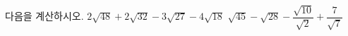 다음을 계산하시오.
 $2\sqrt{48}+2\sqrt{32}-3\sqrt{27}-4\sqrt{18}$
 $\sqrt{45}-\sqrt{28}-\dfrac{\sqrt{10}}{\sqrt{2}}+\dfrac{7}{\sqrt{7}}$
